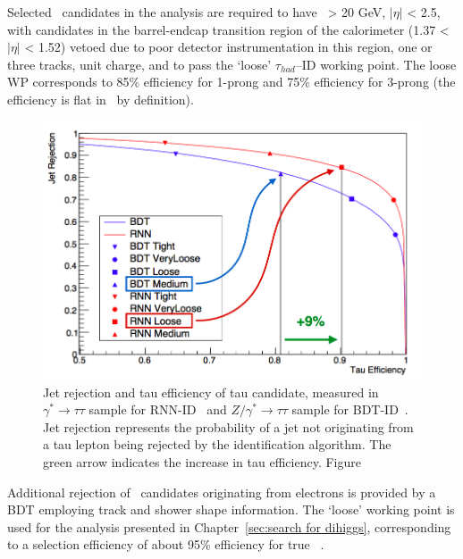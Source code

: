 Selected \tauhadvis\ candidates in the analysis are required to have 
\pt\ > 20 GeV, $|\eta|$ < 2.5, with candidates in the barrel-endcap 
transition region of the calorimeter (1.37 < $|\eta|$ < 1.52) vetoed 
due to poor detector instrumentation in this region, 
one or three tracks, unit charge, and to pass the `loose' $\tau_{had}$--ID working point.
The loose WP corresponds to 85\% efficiency for 1-prong 
and 75\% efficiency for 3-prong (the efficiency is
flat in \pt\ by definition).
\begin{figure}[bth]
	\begin{centering}	
	\includegraphics[width=.9\textwidth]{Reconstruction/plots/tauRNN.png}
	\caption{Jet rejection and tau efficiency of tau candidate, 
    measured in $\gamma^* \rightarrow \tau\tau$ sample for RNN-ID~\cite{ATL-PHYS-PUB-2019-033}
    and $Z/\gamma^* \rightarrow \tau\tau$ sample for BDT-ID~\cite{ATL-PHYS-PUB-2015-045}.
    Jet rejection represents the probability of a jet 
    not originating from a tau lepton being rejected 
    by the identification algorithm.
    The green arrow indicates the increase in tau efficiency.
    Figure}
	\label{fig:RNNtau}
	\end{centering}
\end{figure}

Additional rejection of \tauhadvis\ candidates originating 
from electrons is provided by a BDT employing track
and shower shape information. The `loose' working point is used
for the analysis presented in Chapter~\ref{sec:search for dihiggs}, 
corresponding to a selection efficiency
of about 95\% efficiency for true \tauhadvis~\cite{ATLAS-CONF-2017-029}.

